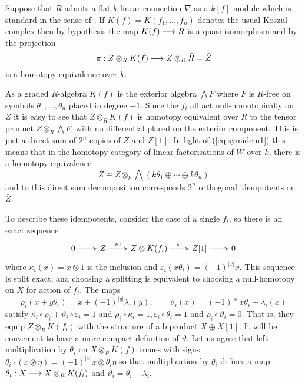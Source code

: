 \documentclass{compositio}
\theoremstyle{definition}
\numberwithin{equation}{section}
\begin{document}
Suppose that $R$ admits a flat $k$-linear connection $\nabla$ as a $k[f]$-module which is standard in the sense of \cite{??}. If $K(f) = K(f_1,\ldots,f_n)$ denotes the usual Koszul complex then by hypothesis the map $K(f) \longrightarrow \bar{R}$ is a quasi-isomorphism and by \cite[Section 10]{dm1102.2957} the projection
\begin{equation}\label{eq:symidem1}
\pi: Z \otimes_R K(f) \longrightarrow Z \otimes_R \bar{R} = \bar{Z}
\end{equation}
is a homotopy equivalence over $k$. 

As a graded $R$-algebra $K(f)$ is the exterior algebra $\bigwedge F$ where $F$ is $R$-free on symbols $\theta_1,\ldots,\theta_n$ placed in degree $-1$. Since the $f_i$ all act null-homotopically on $Z$ it is easy to see that $Z \otimes_R K(f)$ is homotopy equivalent over $R$ to the tensor product $Z \otimes_R \bigwedge F$, with no differential placed on the exterior component. This is just a direct sum of $2^n$ copies of $Z$ and $Z[1]$. In light of (\ref{eq:symidem1}) this means that in the homotopy category of linear factorisations of $W$ over $k$, there is a homotopy equivalence
\[
\bar{Z} \cong Z \otimes_k \bigwedge (k\theta_1 \oplus \cdots \oplus k\theta_n)
\]
and to this direct sum decomposition corresponds $2^n$ orthogonal idempotents on $\bar{Z}$.

To describe these idempotents, consider the case of a single $f_i$, so there is an exact sequence
\[
\xymatrix{
0 \ar[r] & Z \ar[r]^-{\kappa_i} & Z \otimes K(f_i) \ar[r]^-{\varepsilon_i} & Z[1] \ar[r] & 0
}
\]
where $\kappa_i(x) = x \otimes 1$ is the inclusion and $\varepsilon_i( x \theta_i ) = (-1)^{|x|} x$. This sequence is split exact, and choosing a splitting is equivalent to choosing a null-homotopy on $X$ for action of $f_i$. The maps
\[
\rho_i(x + y \theta_i) = x + (-1)^{|y|} \lambda_i(y), \qquad \vartheta_i(x) = (-1)^{|x|} x \theta_i - \lambda_i(x)
\]
satisfy $\kappa_i \circ \rho_i + \vartheta_i \circ \varepsilon_i = 1$ and $\rho_i \circ \kappa_i = 1, \varepsilon_i \circ \theta_i = 1$ and $\rho_i \circ \vartheta_i = 0$. That is, they equip $Z \otimes_R K(f_i)$ with the structure of a biproduct $X \oplus X[1]$. It will be convenient to have a more compact definition of $\vartheta$. Let us agree that left multiplication by $\theta_i$ on $X \otimes_R K(f)$ comes with signs $\theta_i \cdot (x \otimes \eta) = (-1)^{|x|} x \otimes \theta_i \eta$ so that multiplication by $\theta_i$ defines a map $\theta_i: X \longrightarrow X \otimes_R K(f_i)$ and $\vartheta_i = \theta_i - \lambda_i$.
\end{document}
